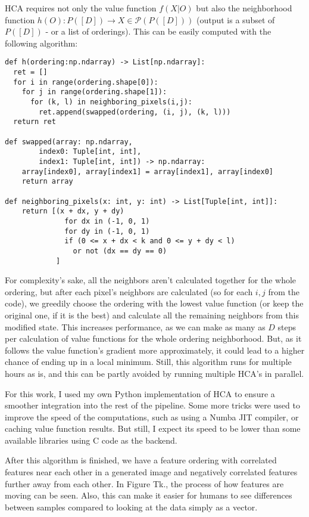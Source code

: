 HCA requires not only the value function $f(X|O)$ but also the neighborhood function $h(O): P([D]) \rightarrow X \in \mathcal{P}(P([D]))$ (output is a subset of $P([D])$ - or a list of orderings). This can be easily computed with the following algorithm:
\begin{lstlisting}
def h(ordering:np.ndarray) -> List[np.ndarray]:
  ret = []
  for i in range(ordering.shape[0]):
    for j in range(ordering.shape[1]):
      for (k, l) in neighboring_pixels(i,j):
        ret.append(swapped(ordering, (i, j), (k, l)))
  return ret

def swapped(array: np.ndarray,
        index0: Tuple[int, int],
        index1: Tuple[int, int]) -> np.ndarray:
    array[index0], array[index1] = array[index1], array[index0]
    return array

def neighboring_pixels(x: int, y: int) -> List[Tuple[int, int]]:
    return [(x + dx, y + dy) 
              for dx in (-1, 0, 1)
              for dy in (-1, 0, 1)
              if (0 <= x + dx < k and 0 <= y + dy < l)
                or not (dx == dy == 0)
            ]
\end{lstlisting}

For complexity's sake, all the neighbors aren't calculated together for the whole ordering, but after each pixel's neighbors are calculated (so for each $i,j$ from the code), we greedily choose the ordering with the lowest value function (or keep the original one, if it is the best) and calculate all the remaining neighbors from this modified state. This increases performance, as we can make as many as $D$ steps per calculation of value functions for the whole ordering neighborhood. But, as it follows the value function's gradient more approximately, it could lead to a higher chance of ending up in a local minimum. Still, this algorithm runs for multiple hours as is, and this can be partly avoided by running multiple HCA's in parallel.

For this work, I used my own Python implementation of HCA to ensure a smoother integration into the rest of the pipeline. Some more tricks were used to improve the speed of the computations, such as using a Numba JIT compiler, or caching value function results. But still, I expect its speed to be lower than some available libraries using C code as the backend.

After this algorithm is finished, we have a feature ordering with correlated features near each other in a generated image and negatively correlated features further away from each other. In Figure Tk., the process of how features are moving can be seen. Also, this can make it easier for humans to see differences between samples compared to looking at the data simply as a vector.

